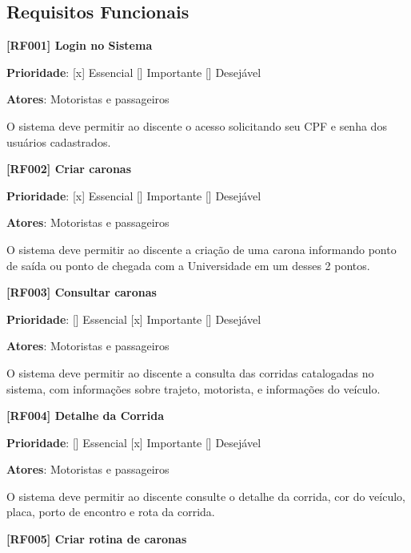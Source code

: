 





\subsection{Requisitos Funcionais}
\textbf{[RF001] Login no Sistema}

\textbf{Prioridade}:      [x] Essencial        [] Importante     [] Desejável 

\textbf{Atores}: Motoristas e passageiros


O sistema deve permitir ao discente o acesso solicitando seu CPF e senha dos usuários cadastrados.




\textbf{[RF002] Criar caronas}

\textbf{Prioridade}:      [x] Essencial        [] Importante     [] Desejável 

\textbf{Atores}: Motoristas e passageiros

O sistema deve permitir ao discente a criação de uma carona informando ponto de saída ou ponto de chegada com a Universidade em um desses 2 pontos.

\textbf{[RF003] Consultar caronas}

\textbf{Prioridade}:      [] Essencial        [x] Importante     [] Desejável 

\textbf{Atores}: Motoristas e passageiros

O sistema deve permitir ao discente a consulta das corridas catalogadas no sistema, com informações sobre trajeto, motorista, e informações do veículo.

\textbf{[RF004] Detalhe da Corrida}

\textbf{Prioridade}:      [] Essencial        [x] Importante     [] Desejável 

\textbf{Atores}: Motoristas e passageiros

O sistema deve permitir ao discente consulte o detalhe da corrida, cor do veículo, placa, porto de encontro e rota da corrida.

\textbf{[RF005] Criar rotina de caronas}

